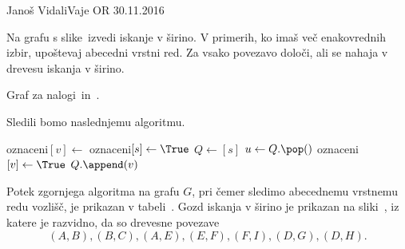 
\begin{naloga}{Janoš Vidali}{Vaje OR 30.11.2016}
\begin{vprasanje}
Na grafu s slike~\fig izvedi iskanje v širino.
V primerih, ko imaš več ena\-ko\-vred\-nih izbir,
upoštevaj abecedni vrstni red.
Za vsako povezavo določi, ali se nahaja v drevesu iskanja v širino.

\begin{slika}
\pgfslika
\caption{Graf za nalogi~\nal in~\nal[dfs].}
\end{slika}
\end{vprasanje}

\begin{odgovor}
Sledili bomo naslednjemu algoritmu.
\begin{small}
\begin{algorithmic}
		\State oznaceni$[v] \gets$ \False
	\EndFor
			\State oznaceni$[s] \gets \True$
			\State $Q \gets [s]$
				\State $u \gets Q.\pop()$
						\State oznaceni$[v] \gets \True$
						\State $Q.\append(v)$
					\EndIf
				\EndFor
			\EndWhile
		\EndIf
	\EndFor
\end{algorithmic}
\end{small}
%
Potek zgornjega algoritma na grafu $G$,
pri čemer sledimo abecednemu vrstnemu redu vozlišč,
je prikazan v tabeli~\tab.
Gozd iskanja v širino je prikazan na sliki~,
iz katere je razvidno, da so drevesne povezave
$$
(A, B), (B, C), (A, E), (E, F), (F, I), (D, G), (D, H).
$$


\end{odgovor}
\end{naloga}

